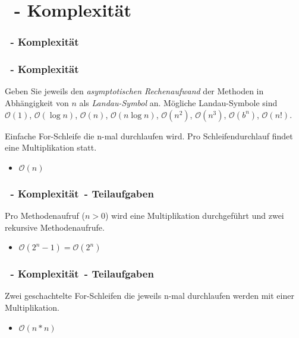 \def\stitle{\theexercise\ - Komplexit\"at}

\section{\stitle}
\begin{frame}
  \frametitle{\stitle}%
\tableofcontents[current]
\end{frame}


\begin{frame}%
  \frametitle{\stitle}%


Geben Sie jeweils den \emph{asymptotischen Rechenaufwand} der Methoden in Abhängigkeit von $n$ als \emph{Landau-Symbol} an.
Mögliche Landau-Symbole sind $\mathcal{O}(1)$, $\mathcal{O}(\log n)$, $\mathcal{O}(n)$, $\mathcal{O}(n \log n)$, $\mathcal{O}(n^2)$, $\mathcal{O}(n^3)$, $\mathcal{O}(b^n)$, $\mathcal{O}(n!)$.



\pause
Einfache For-Schleife die n-mal durchlaufen wird.
Pro Schleifendurchlauf findet eine Multiplikation statt.
\begin{itemize}
    \item $\mathcal{O}(n)$
\end{itemize}
\end{frame}


\begin{frame}%
  \frametitle{\stitle\ - Teilaufgaben}%

\pause
Pro Methodenaufruf ($n>0$) wird eine Multiplikation durchgeführt und zwei rekursive Methodenaufrufe.
\begin{itemize}
    \item $\mathcal{O}(2^n -1) = \mathcal{O}(2^n)$
\end{itemize}
\end{frame}


\begin{frame}%
  \frametitle{\stitle\ - Teilaufgaben}%

\pause
Zwei geschachtelte For-Schleifen die jeweils n-mal durchlaufen werden mit einer Multiplikation.
\begin{itemize}
    \item $\mathcal{O}(n*n)$
\end{itemize}
\end{frame}


